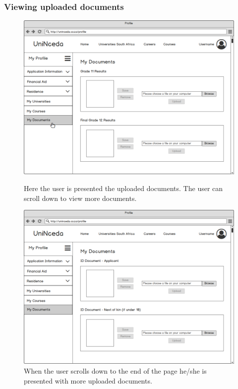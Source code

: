 \documentclass[a4paper, 12pt]{article}
\begin{document}
\subsubsection{Viewing uploaded documents}

\setcounter{figure}{0}

\begin{figure}[H]
\centering
\includegraphics[scale=0.35]{ProfileMyDocuments}
\caption{Here the user is presented the uploaded documents. The user can scroll down to view more documents.}
\label{ProfileMyDocuments}


\vspace{1cm}

\includegraphics[scale=0.35]{ProfileMyDocumentsPage2}
\caption{When the user scrolls down to the end of the page he/she is presented with more uploaded documents.}
\label{ProfileMyDocumentsPage2}


\end{figure}
\end{document}
